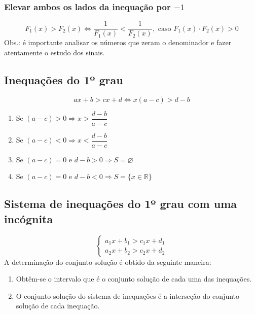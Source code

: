 \documentclass{article}
\begin{document}
\subsubsection{Elevar ambos os lados da inequação por $-1$}
\begin{equation*}
    F_1(x)>F_2(x) \Leftrightarrow \dfrac{1}{F_1(x)} < \dfrac{1}{F_2(x)}, \text{ caso } F_1(x)\cdot F_2(x)>0 
\end{equation*}
\indent Obs.: é importante analisar os números que zeram o denominador e fazer atentamente o estudo dos sinais.

\subsection{Inequações do 1º grau}
\begin{equation*}
    ax+b>cx+d\Leftrightarrow x(a-c)>d-b
\end{equation*}
\begin{enumerate}
    \item Se $(a-c)>0\Rightarrow x>\dfrac{d-b}{a-c}$
    \item Se $(a-c)<0\Rightarrow x<\dfrac{d-b}{a-c}$
    \item Se $(a-c)=0$ e $d-b>0\Rightarrow S=\varnothing$
    \item Se $(a-c)=0$ e $d-b<0\Rightarrow S=\{x\in\mathbb{R}\}$
\end{enumerate}

\subsection{Sistema de inequações do 1º grau com uma incógnita}
\begin{equation*}
    \left\{\begin{aligned}
        a_1x+b_1>c_1x+d_1 \\
        a_2x+b_2>c_2x+d_2
    \end{aligned}\right.
\end{equation*}
\indent A determinação do conjunto solução é obtido da seguinte maneira:
\begin{enumerate}
    \item Obtêm-se o intervalo que é o conjunto solução de cada uma das inequações.
    \item O conjunto solução do sistema de inequações é a interseção do conjunto solução de cada inequação.
\end{enumerate}
\end{document}
